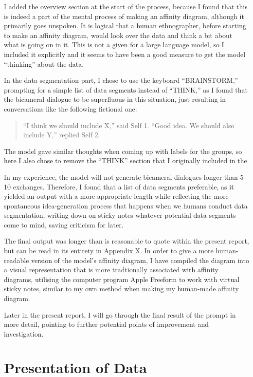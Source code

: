 \documentclass[
]{book}
\begin{document}
I added the overview section at the start of the process, because I found that this is indeed a part of the mental process of making an affinity diagram, although it primarily goes unspoken. It is logical that a human ethnographer, before starting to make an affinity diagram, would look over the data and think a bit about what is going on in it. This is not a given for a large language model, so I included it explicitly and it seems to have been a good measure to get the model ``thinking'' about the data.

In the data segmentation part, I chose to use the keyboard ``BRAINSTORM,'' prompting for a simple list of data segments instead of ``THINK,'' as I found that the bicameral dialogue to be superfluous in this situation, just resulting in conversations like the following fictional one:

\begin{quote}
``I think we should include X,'' said Self 1. ``Good idea. We should also include Y,'' replied Self 2.
\end{quote}

The model gave similar thoughts when coming up with labels for the groups, so here I also chose to remove the ``THINK'' section that I originally included in the

In my experience, the model will not generate bicameral dialogues longer than 5-10 exchanges. Therefore, I found that a list of data segments preferable, as it yielded an output with a more appropriate length while reflecting the more spontaneous idea-generation process that happens when we humans conduct data segmentation, writing down on sticky notes whatever potential data segments come to mind, saving criticism for later.

The final output was longer than is reasonable to quote within the present report, but can be read in its entirety in Appendix X. In order to give a more human-readable version of the model's affinity diagram, I have compiled the diagram into a visual representation that is more tradtionally associated with affinity diagrams, utilising the computer program Apple Freeform to work with virtual sticky notes, similar to my own method when making my human-made affinity diagram.

Later in the present report, I will go through the final result of the prompt in more detail, pointing to further potential points of improvement and investigation.

\hypertarget{presentation-of-data}{%
\section{Presentation of Data}\label{presentation-of-data}}
\end{document}

